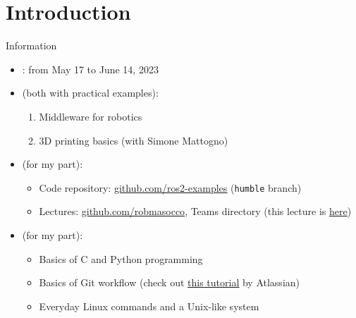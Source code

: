 
\section{Introduction}
\graphicspath{{figs/section1/}}

\begin{frame}{Information}
	\begin{itemize}
		\item {}: from May 17 to June 14, 2023
		\item {} (both with practical examples):
		      \begin{enumerate}
			      \item Middleware for robotics
			      \item 3D printing basics (with Simone Mattogno)
		      \end{enumerate}
		\item {} (for my part):
		      \begin{itemize}
			      \item Code repository: \href{https://github.com/IntelligentSystemsLabUTV/ros2-examples}{\color{blue}\underline{github.com/ros2-examples}} (\texttt{humble} branch)
			      \item Lectures: \href{https://github.com/stars/robmasocco/lists/lectures}{\color{blue}\underline{github.com/robmasocco}}, Teams directory (this lecture is \href{https://github.com/robmasocco/DAFN23_Robotics_1}{\color{blue}\underline{here}})
		      \end{itemize}
		\item {} (for my part):
		      \begin{itemize}
			      \item Basics of C and Python programming
			      \item Basics of Git workflow (check out \href{https://www.atlassian.com/git/tutorials/what-is-git}{\color{blue}\underline{this tutorial}} by Atlassian)
			      \item Everyday Linux commands and a Unix-like system
		      \end{itemize}
	\end{itemize}
\end{frame}

